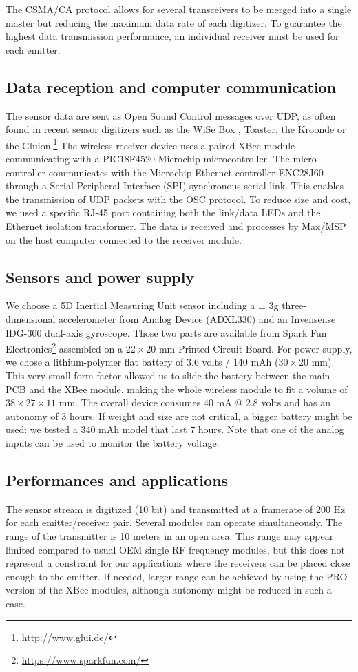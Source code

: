 The CSMA/CA protocol allows for several transceivers to be merged into a single master but reducing the maximum data rate of each digitizer. To guarantee the highest data transmission performance, an individual receiver must be used for each emitter. 

\subsection{Data reception and computer communication}
The sensor data are sent as Open Sound Control messages over UDP, as often found in recent sensor digitizers such as the WiSe Box \cite{Flety:2005}, Toaster, the Kroonde \cite{Coduys:2004} or the Gluion.\footnote{\url{http://www.glui.de/}} The wireless receiver device uses a paired XBee module communicating with a PIC18F4520 Microchip microcontroller. The micro-controller communicates with the Microchip Ethernet controller ENC28J60 through a Serial Peripheral Interface (SPI) synchronous serial link. This enables the transmission of UDP packets with the OSC protocol. To reduce size and cost, we used a specific RJ-45 port containing both the link/data LEDs and the Ethernet isolation transformer. The data is received and processes by Max/MSP on the host computer connected to the receiver module.

\subsection{Sensors and power supply}
We choose a 5D Inertial Measuring Unit sensor including a ± 3g three-dimensional accelerometer from Analog Device (ADXL330) and an Invensense IDG-300 dual-axis gyroscope. Those two parts are available from Spark Fun Electronics\footnote{\url{https://www.sparkfun.com/}} assembled on a $22\times20$ mm Printed Circuit Board. 
For power supply, we chose a lithium-polymer flat battery of 3.6 volts / 140 mAh ($30\times20$ mm). This very small form factor allowed us to slide the battery between the main PCB and the XBee module, making the whole wireless module to fit a volume of $38\times27\times11$ mm. The overall device consumes 40 mA @ 2.8 volts and has an autonomy of 3 hours. If weight and size are not critical, a bigger battery might be used: we tested a 340 mAh model that last 7 hours. Note that one of the analog inputs can be used to monitor the battery voltage. 

\subsection{Performances and applications}
The sensor stream is digitized (10 bit) and transmitted at a framerate of 200 Hz for each emitter/receiver pair. Several modules can operate simultaneously. The range of the transmitter is 10 meters in an open area. This range may appear limited compared to usual OEM single RF frequency modules, but this does not represent a constraint for our applications where the receivers can be placed close enough to the emitter. If needed, larger range can be achieved by using the PRO version of the XBee modules, although autonomy might be reduced in such a case. 

